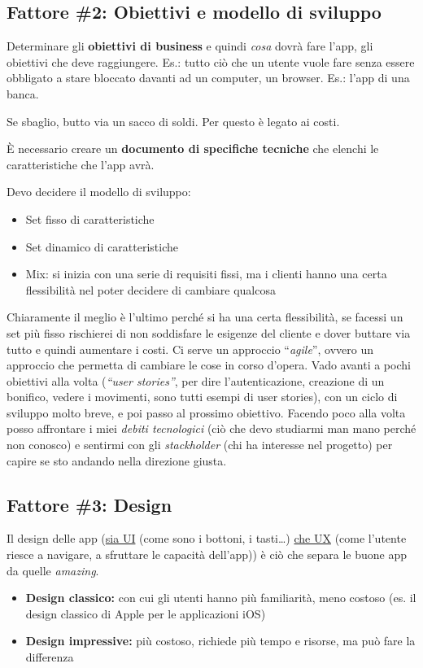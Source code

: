 \subsection{Fattore \#2: Obiettivi e modello di sviluppo}
\par Determinare gli \textbf{obiettivi di business} e quindi \textit{cosa} dovrà fare l'app, gli obiettivi che deve raggiungere. Es.: tutto ciò che un utente vuole fare senza essere obbligato a stare bloccato davanti ad un computer, un browser. Es.: l'app di una banca.
\par Se sbaglio, butto via un sacco di soldi. Per questo è legato ai costi.
\par \`E necessario creare un \textbf{documento di specifiche tecniche} che elenchi le caratteristiche che l'app avrà.
\par Devo decidere il modello di sviluppo:
\begin{itemize}
    \item Set fisso di caratteristiche
    \item Set dinamico di caratteristiche
    \item Mix: si inizia con una serie di requisiti fissi, ma i clienti hanno una certa flessibilità nel poter decidere di cambiare qualcosa
\end{itemize}
\par Chiaramente il meglio è l'ultimo perché si ha una certa flessibilità, se facessi un set più fisso rischierei di non soddisfare le esigenze del cliente e dover buttare via tutto e quindi aumentare i costi. Ci serve un approccio ``\textit{agile}'', ovvero un approccio che permetta di cambiare le cose in corso d'opera. Vado avanti a pochi obiettivi alla volta (\textit{``user stories''}, per dire l'autenticazione, creazione di un bonifico, vedere i movimenti, sono tutti esempi di user stories), con un ciclo di sviluppo molto breve, e poi passo al prossimo obiettivo. Facendo poco alla volta posso affrontare i miei \textit{debiti tecnologici} (ciò che devo studiarmi man mano perché non conosco) e sentirmi con gli \textit{stackholder} (chi ha interesse nel progetto) per capire se sto andando nella direzione giusta.

\subsection{Fattore \#3: Design}
\par Il design delle app (\underline{sia UI} (come sono i bottoni, i tasti\dots) \underline{che UX} (come l'utente riesce a navigare, a sfruttare le capacità dell'app)) è ciò che separa le buone app da quelle \textit{amazing}.
\begin{itemize}
    \item \textbf{Design classico:} con cui gli utenti hanno più familiarità, meno costoso (es. il design classico di Apple per le applicazioni iOS)
    \item \textbf{Design impressive:} più costoso, richiede più tempo e risorse, ma può fare la differenza
\end{itemize}

